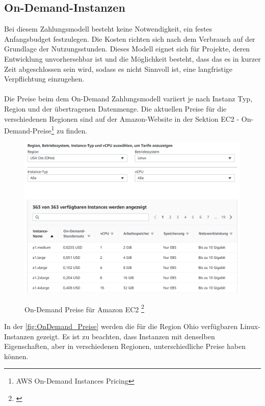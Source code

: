 \subsection{On-Demand-Instanzen}
Bei diesem Zahlungsmodell besteht keine Notwendigkeit, ein festes Anfangsbudget festzulegen. Die Kosten richten sich nach dem Verbrauch auf der Grundlage der Nutzungsstunden. Dieses Modell eignet sich für Projekte, deren Entwicklung unvorhersehbar ist und die Möglichkeit besteht, dass das es in kurzer Zeit abgeschlossen sein wird, sodass es nicht Sinnvoll ist, eine langfristige Verpflichtung einzugehen.
\\\\
Die Preise beim dem On-Demand Zahlungsmodell variiert je nach Instanz Typ, Region und der übertragenen Datenmenge. Die aktuellen Preise für die verschiedenen Regionen sind auf der Amazon-Website in der Sektion EC2 - On-Demand-Preise\footnote{\cite{AMZ02}AWS On-Demand Instances Pricing} zu finden. 
\begin{figure}
    \centering
    \includegraphics[scale=0.5]{sources/On-Demand-Pläne für Amazon EC2}\label{fig:OnDemand_Preise}\\
    \caption[On-Demand Preise für Amazon EC2]{}
    \label{fig:OnDemand_Preise}  On-Demand Preise für Amazon EC2 \footnote{\cite{AMZ02}}
  \end{figure}
In der \autoref{fig:OnDemand_Preise} werden die für die Region Ohio verfügbaren Linux-Instanzen gezeigt. Es ist zu beachten, dass Instanzen mit denselben Eigenschaften, aber in verschiedenen Regionen, unterschiedliche Preise haben können.
